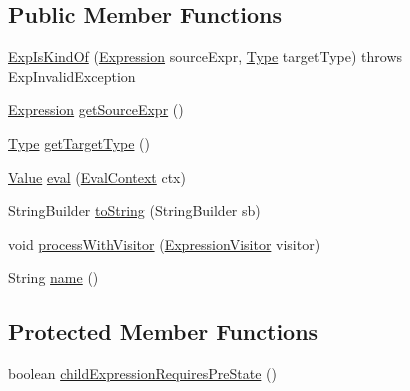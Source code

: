 \subsection*{Public Member Functions}
\begin{DoxyCompactItemize}
\item 
\hyperlink{classorg_1_1tzi_1_1use_1_1uml_1_1ocl_1_1expr_1_1_exp_is_kind_of_a029785076a960581fbe656c30d7be6b0}{Exp\-Is\-Kind\-Of} (\hyperlink{classorg_1_1tzi_1_1use_1_1uml_1_1ocl_1_1expr_1_1_expression}{Expression} source\-Expr, \hyperlink{interfaceorg_1_1tzi_1_1use_1_1uml_1_1ocl_1_1type_1_1_type}{Type} target\-Type)  throws Exp\-Invalid\-Exception 
\item 
\hyperlink{classorg_1_1tzi_1_1use_1_1uml_1_1ocl_1_1expr_1_1_expression}{Expression} \hyperlink{classorg_1_1tzi_1_1use_1_1uml_1_1ocl_1_1expr_1_1_exp_is_kind_of_a096fc53618efb7ea6fdd81067e32c612}{get\-Source\-Expr} ()
\item 
\hyperlink{interfaceorg_1_1tzi_1_1use_1_1uml_1_1ocl_1_1type_1_1_type}{Type} \hyperlink{classorg_1_1tzi_1_1use_1_1uml_1_1ocl_1_1expr_1_1_exp_is_kind_of_ae5604eab2b633b822670141eaff4649f}{get\-Target\-Type} ()
\item 
\hyperlink{classorg_1_1tzi_1_1use_1_1uml_1_1ocl_1_1value_1_1_value}{Value} \hyperlink{classorg_1_1tzi_1_1use_1_1uml_1_1ocl_1_1expr_1_1_exp_is_kind_of_a1cab099926aaaa1d215cce447af1ccbf}{eval} (\hyperlink{classorg_1_1tzi_1_1use_1_1uml_1_1ocl_1_1expr_1_1_eval_context}{Eval\-Context} ctx)
\item 
String\-Builder \hyperlink{classorg_1_1tzi_1_1use_1_1uml_1_1ocl_1_1expr_1_1_exp_is_kind_of_ab348f468ce13ebf8b8d981dd33cc7c00}{to\-String} (String\-Builder sb)
\item 
void \hyperlink{classorg_1_1tzi_1_1use_1_1uml_1_1ocl_1_1expr_1_1_exp_is_kind_of_a2b6585ce81e466ecff823b6e27c0795e}{process\-With\-Visitor} (\hyperlink{interfaceorg_1_1tzi_1_1use_1_1uml_1_1ocl_1_1expr_1_1_expression_visitor}{Expression\-Visitor} visitor)
\item 
String \hyperlink{classorg_1_1tzi_1_1use_1_1uml_1_1ocl_1_1expr_1_1_exp_is_kind_of_a4b5cf4583dbf9d8abab05a8ca60e55ea}{name} ()
\end{DoxyCompactItemize}
\subsection*{Protected Member Functions}
\begin{DoxyCompactItemize}
\item 
boolean \hyperlink{classorg_1_1tzi_1_1use_1_1uml_1_1ocl_1_1expr_1_1_exp_is_kind_of_af2d186ae94d1e1f9dc855732b5c7cffa}{child\-Expression\-Requires\-Pre\-State} ()
\end{DoxyCompactItemize}


